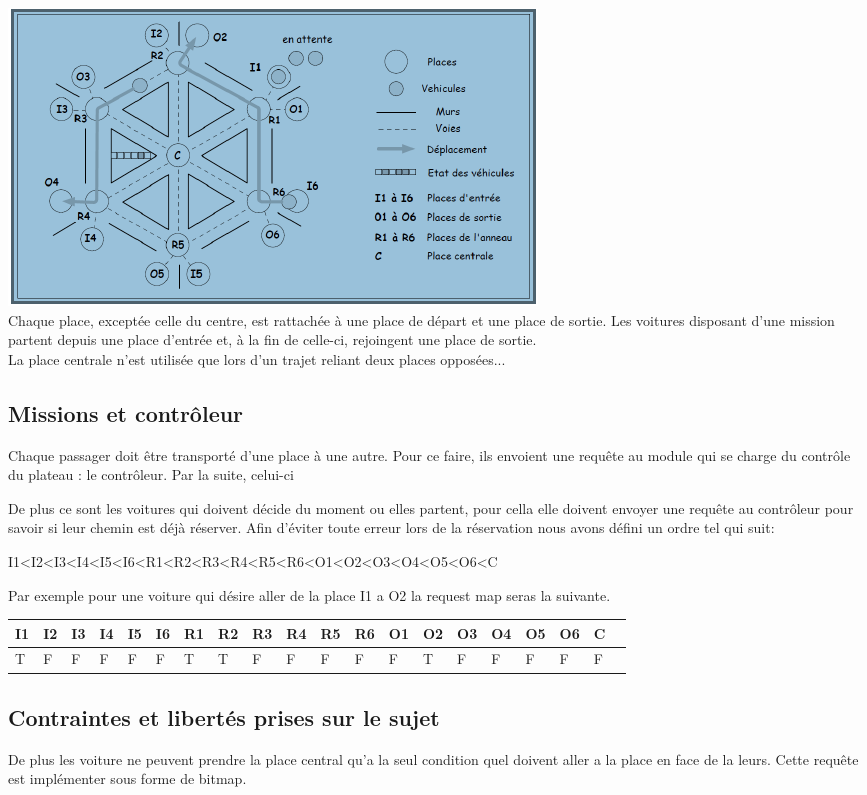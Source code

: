 \documentclass[a4paper, titlepage]{report}
\begin{document}
\includegraphics[]{Images/Plateau}
\vspace{0.5cm}
\\
Chaque place, exceptée celle du centre, est rattachée à une place de départ et une place de sortie. Les voitures disposant d'une mission partent depuis une place d'entrée et, à la fin de celle-ci, rejoingent une place de sortie.\\
La place centrale n'est utilisée que lors d'un trajet reliant deux places opposées...
\subsection{Missions et contrôleur}
Chaque passager doit être transporté d'une place à une autre. Pour ce faire, ils envoient une requête au module qui se charge du contrôle du plateau : le contrôleur. Par la suite, celui-ci

De plus ce sont les voitures qui doivent décide du moment ou elles partent, pour cella elle doivent envoyer une requête au contrôleur pour savoir si leur chemin est déjà réserver. Afin d'éviter toute erreur lors de la réservation nous avons défini un ordre tel qui suit:
\begin{center}
I1<I2<I3<I4<I5<I6<R1<R2<R3<R4<R5<R6<O1<O2<O3<O4<O5<O6<C
\end{center}

Par exemple pour une voiture qui désire aller de la place I1 a O2 la request map seras la suivante.
\vspace{0.5cm}

\begin{tabular}{|l|l|l|l|l|l|l|l|l|l|l|l|l|l|l|l|l|l|l|l|}

\hline
  I1 & I2 & I3 & I4 & I5 & I6 & R1 & R2 & R3 & R4 & R5 & R6 & O1 & O2 & O3 & O4 & O5 & O6 & C \\
  \hline
   T & F & F & F & F & F & T & T & F & F & F & F & F & T & F & F & F & F & F\\
 \hline

\end{tabular}
\subsection{Contraintes et libertés prises sur le sujet}


De plus les voiture ne peuvent prendre la place central qu'a la seul condition quel doivent aller a la place en face de la leurs.
Cette requête est implémenter sous forme de bitmap.
\end{document}
